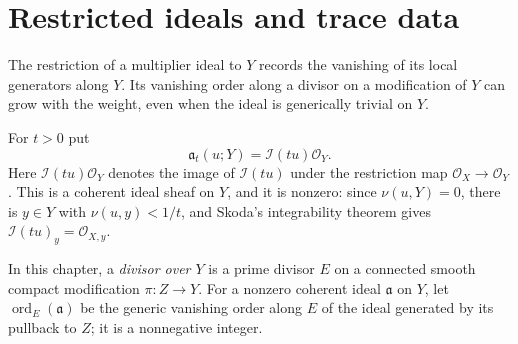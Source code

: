 \section{Restricted ideals and trace data}\label{sec:restricted-ideals}\label{sec:trace-additivity}

The restriction of a multiplier ideal to $Y$ records the vanishing of its local generators along $Y$. Its vanishing order along a divisor on a modification of $Y$ can grow with the weight, even when the ideal is generically trivial on $Y$.

For $t>0$ put
\[
 \mathfrak a_t(u;Y)=\mathcal I(tu)\mathcal O_Y.
\]
Here $\mathcal I(tu)\mathcal O_Y$ denotes the image of $\mathcal I(tu)$ under the restriction map $\mathcal O_X\to\mathcal O_Y$. This is a coherent ideal sheaf on $Y$, and it is nonzero: since $\nu(u,Y)=0$, there is $y\in Y$ with $\nu(u,y)<1/t$, and Skoda's integrability theorem gives $\mathcal I(tu)_y=\mathcal O_{X,y}$.

In this chapter, a \emph{divisor over $Y$} is a prime divisor $E$ on a connected smooth compact modification $\pi\colon Z\to Y$. For a nonzero coherent ideal $\mathfrak a$ on $Y$, let $\operatorname{ord}_E(\mathfrak a)$ be the generic vanishing order along $E$ of the ideal generated by its pullback to $Z$; it is a nonnegative integer.

